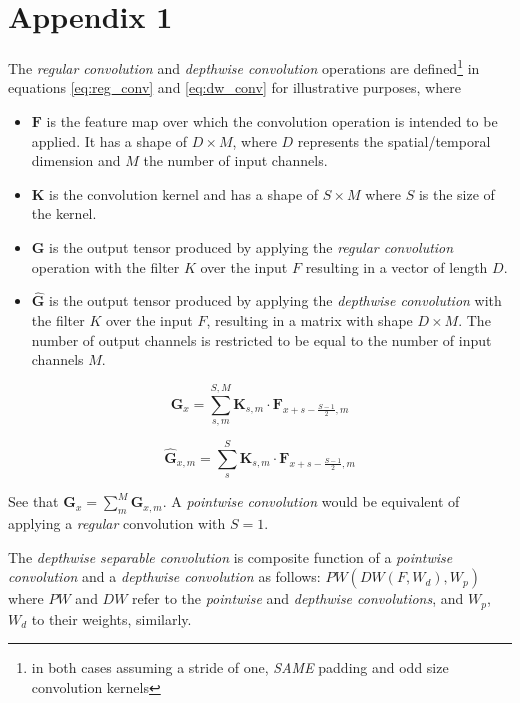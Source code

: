 \section*{Appendix 1}
The \textit{regular convolution} and \textit{depthwise convolution} operations \autocite{howard2017}  are defined\footnote{in both cases assuming a stride of one, \textit{SAME} padding and odd size convolution kernels} in equations \ref{eq:reg_conv} and  \ref{eq:dw_conv} for illustrative purposes, where

\begin{itemize}
	\item $\mathbf{F}$ is the feature map over which the convolution operation is intended to be applied. It has a shape of $D \times M$, where $D$ represents the spatial/temporal dimension and $M$ the number of input channels.
	\item $\mathbf{K}$ is the convolution kernel and has a shape of $S \times M$ where $S$ is the size of the kernel.
	\item $\mathbf{G}$ is the output tensor produced by applying the \textit{regular convolution} operation with the filter $K$ over the input $F$ resulting in a vector of length $D$.
	\item $\hat{\mathbf{G}}$ is the output tensor produced by applying the \textit{depthwise convolution} with the filter $K$ over the input $F$, resulting in a matrix with shape $D \times M$. The number of output channels is restricted to be equal to the number of input channels $M$.
\end{itemize}


\begin{equation}
\mathbf{G}_{x} = \sum_{s, m}^{S,M} \mathbf{K}_{s, m} \cdot \mathbf{F}_{x+s-\frac{S-1}{2}, m}
\label{eq:reg_conv}
\end{equation}

\begin{equation}
\hat{\mathbf{G}}_{x, m} = \sum_{s}^{S} \mathbf{K}_{s, m} \cdot \mathbf{F}_{x+s-\frac{S-1}{2}, m}
\label{eq:dw_conv}
\end{equation}

See that $\mathbf{G}_{x} =  \sum_{m}^{M} \hat{\mathbf{G}}_{x, m}$. A \textit{pointwise convolution} would be equivalent of applying a \textit{regular} convolution with $S=1$.

The \textit{depthwise separable convolution} is composite function of a \textit{pointwise convolution} and a \textit{depthwise convolution} as follows: $PW(DW(F,W_{d}),W_{p})$ where $PW$ and $DW$ refer to the \textit{pointwise} and \textit{depthwise convolutions}, and $W_{p}$, $W_{d}$ to their weights, similarly.

